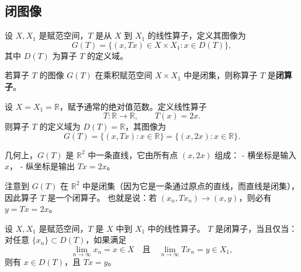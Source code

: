 \subsection{闭图像}
\begin{definition}[算子的图像]
设 $X, X_1$ 是赋范空间，$T$ 是从 $X$ 到 $X_1$ 的线性算子，定义其图像为
\[
G(T)=\{(x,Tx)\in X\times X_1: x\in D(T)\},
\]
其中 $D(T)$ 为算子 $T$ 的定义域。
\end{definition}

\begin{definition}[闭算子]
若算子 $T$ 的图像 $G(T)$ 在乘积赋范空间 $X\times X_1$ 中是闭集，则称算子 $T$ 是\textbf{闭算子}。
\end{definition}

\begin{example}
设 $X=X_1=\mathbb{R}$，赋予通常的绝对值范数。定义线性算子
\[
T:\mathbb{R}\to\mathbb{R},\qquad T(x)=2x.
\]
则算子 $T$ 的定义域为 $D(T)=\mathbb{R}$，其图像为
\[
G(T)=\{(x,Tx):x\in\mathbb{R}\}
=\{(x,2x):x\in\mathbb{R}\}.
\]

几何上，$G(T)$ 是 $\mathbb{R}^2$ 中一条直线，它由所有点 $(x,2x)$ 组成：
- 横坐标是输入 $x$，
- 纵坐标是输出 $Tx=2x$。

注意到 $G(T)$ 在 $\mathbb{R}^2$ 中是闭集（因为它是一条通过原点的直线，而直线是闭集），
因此算子 $T$ 是一个闭算子。
也就是说：若 $(x_n,Tx_n)\to (x,y)$，则必有 $y=Tx=2x$。
\end{example}
\begin{theorem}[闭算子 = 图像在极限下封闭：输入与输出都收敛时，极限点仍在图像里。]
设 $X, X_1$ 是赋范空间，$T$ 是 $X$ 中到 $X_1$ 中的线性算子。  
$T$ 是闭算子，当且仅当：对任意 $\{x_n\}\subset D(T)$，如果满足
\[
\lim_{n\to\infty} x_n = x \in X
\quad\text{且}\quad
\lim_{n\to\infty} Tx_n = y \in X_1,
\]
则有 $x\in D(T)$，且 $Tx=y$。
\end{theorem}

